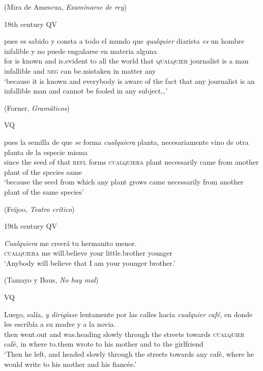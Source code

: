 (Mira de Amescua, \textit{Examinarse de rey})
\z
\z

\ea \label{ex:key:288}
  18th century
\ea \label{ex:key:288-1} 
QV 

\gll pues es sabido y consta a todo el mundo que \textit{qualquier} diarista \textit{es} un hombre infalible y no puede engañarse en materia alguna\\
for is known and is.evident to all the world that \textsc{qualquier} journalist is a man infallible and \textsc{neg} can be.mistaken in matter any\\
\glt ‘because it is known and everybody is aware of the fact that any journalist is an infallible man and cannot be fooled in any subject…’

(Forner, \textit{Gramáticos})
      
\ex \label{ex:key:288-2} 
VQ

\gll pues la semilla de que \textit{se} {forma} \textit{cualquiera} planta, necesariamente vino de otra planta de la especie misma\\
since the seed of that \textsc{refl} forms \textsc{cualquiera} plant necessarily came from another plant of the species same\\
\glt ‘because the seed from which any plant grows came necessarily from another plant of the same species’

(Feijoo, \textit{Teatro crítico})
\z
\z

\ea \label{ex:key:289}
  19th century
\ea \label{ex:key:289-1} 
QV 

\gll \textit{Cualquiera} {me} {creerá} tu hermanito menor.\\
\textsc{cualquiera} me will.believe your little.brother younger\\
\glt ‘Anybody will believe that I am your younger brother.’

(Tamayo y Baus, \textit{No hay mal})
      
\ex \label{ex:key:289-2} 
VQ 

\gll Luego, salía, \textit{y} \textit{dirigíase} lentamente por las calles hacia \textit{cualquier} \textit{café}, en donde les escribía a su madre y a la novia.\\
then went.out and was.heading slowly through the streets towards \textsc{cualquier} café, in where to.them wrote to his mother and to the girlfriend\\
\glt ‘Then he left, and headed slowly through the streets towards any café, where he would write to his mother and his fiancée.’

